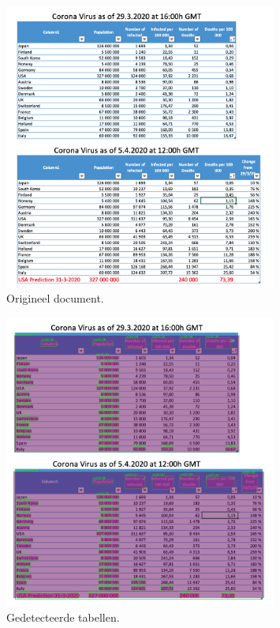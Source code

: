 \begin{figure}[H]
    \centering
    \includegraphics[width=0.8\textwidth]{test-resultaten/30/original.png}
    \caption{Origineel document.}
\end{figure}

\begin{figure}[H]
    \centering
    \includegraphics[width=0.8\textwidth]{test-resultaten/30/detected_tables.png}
    \caption{Gedetecteerde tabellen.}
\end{figure}

